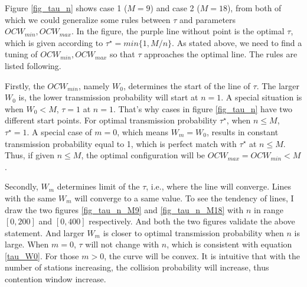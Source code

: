 Figure \ref{fig_tau_n} shows case 1 ($M=9$) and case 2 ($M=18$), from both of which we could generalize some rules between $\tau$ and parameters $OCW_{min}, OCW_{max}$.
In the figure, the purple line without point is the optimal $\tau$, which is given according to $\tau^\star = min\lbrace 1, M/n \rbrace$.
As stated above, we need to find a tuning of $OCW_{min}, OCW_{max}$ so that $\tau$ approaches the optimal line. The rules are listed following.

Firstly, the $OCW_{min}$, namely $W_0$, determines the start of the line of $\tau$. The larger $W_0$ is, the lower transmission probability will start at $n=1$.
A special situation is when $W_0<M$, $\tau=1$ at $n=1$. 
That's why cases in figure \ref{fig_tau_n} have two different start points.
For optimal transmission probability $\tau^\star$, when $n \leq M$, $\tau^\star = 1$. 
A special case of $m=0$, which means $W_m=W_0$, results in constant transmission probability equal to 1, which is perfect match with $\tau^\star$ at $n\leq M$.
Thus, if given $n\leq M$, the optimal configuration will be $OCW_{max}= OCW_{min} < M$. 


Secondly, $W_m$ determines limit of the $\tau$, i.e., where the line will converge. 
Lines with the same $W_m$ will converge to a same value. 
To see the tendency of lines, I draw the two figures \ref{fig_tau_n_M9} and \ref{fig_tau_n_M18} with $n$ in range $[0,200]$ and $[0,400]$ respectively. 
And both the two figures validate the above statement.
And larger $W_m$ is closer to optimal transmission probability when $n$ is large. 
When $m=0$, $\tau$ will not change with $n$, which is consistent with equation \ref{tau_W0}.
For those $m>0$, the curve will be convex. It is intuitive that with the number of stations increasing, the collision probability will increase, thus contention window increase. 


